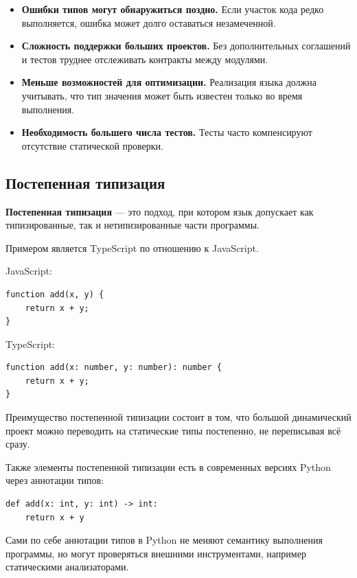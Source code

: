 \documentclass[12pt,a4paper]{article}
\begin{document}
\begin{itemize}
    \item \textbf{Ошибки типов могут обнаружиться поздно.}
    Если участок кода редко выполняется, ошибка может долго оставаться незамеченной.

    \item \textbf{Сложность поддержки больших проектов.}
    Без дополнительных соглашений и тестов труднее отслеживать контракты между
    модулями.

    \item \textbf{Меньше возможностей для оптимизации.}
    Реализация языка должна учитывать, что тип значения может быть известен только
    во время выполнения.

    \item \textbf{Необходимость большего числа тестов.}
    Тесты часто компенсируют отсутствие статической проверки.
\end{itemize}

\subsection{Постепенная типизация}

\textbf{Постепенная типизация} --- это подход, при котором язык допускает как
типизированные, так и нетипизированные части программы.

Примером является TypeScript по отношению к JavaScript.

JavaScript:

\begin{verbatim}
function add(x, y) {
    return x + y;
}
\end{verbatim}

TypeScript:

\begin{verbatim}
function add(x: number, y: number): number {
    return x + y;
}
\end{verbatim}

Преимущество постепенной типизации состоит в том, что большой динамический проект
можно переводить на статические типы постепенно, не переписывая всё сразу.

Также элементы постепенной типизации есть в современных версиях Python через
аннотации типов:

\begin{verbatim}
def add(x: int, y: int) -> int:
    return x + y
\end{verbatim}

Сами по себе аннотации типов в Python не меняют семантику выполнения программы,
но могут проверяться внешними инструментами, например статическими анализаторами.
\end{document}
